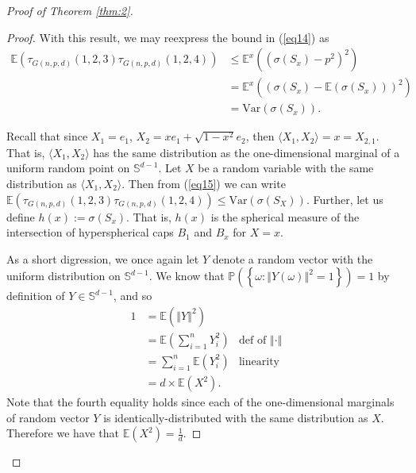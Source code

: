 \documentclass{article}
\begin{document}
\begin{proof}[Proof of Theorem \ref{thm:2}]
\begin{proof}
With this result, we may reexpress the bound in (\ref{eq14}) as
\begin{align}
    \mathbb{E}\left( \tau_{G(n,p,d)}(1,2,3)\tau_{G(n,p,d)}(1,2,4) \right) &\leq \mathbb{E}^x \left( (\sigma(S_x) - p^2)^2\right) \nonumber\\
    &=\mathbb{E}^x \left( (\sigma(S_x) - \mathbb{E}(\sigma(S_x)))^2\right) \nonumber\\
    &= \text{Var}(\sigma(S_x))\label{eq15}.
\end{align}

Recall that since $X_1 = e_1$, $X_2 = xe_1 + \sqrt{1-x^2}e_2$, then $\langle X_1, X_2 \rangle = x = X_{2,1}$. That is, $\langle X_1, X_2 \rangle$ has the same distribution as the one-dimensional marginal of a uniform random point on $\mathbb{S}^{d-1}$. Let $X$ be a random variable with the same distribution as $\langle X_1, X_2 \rangle$. Then from (\ref{eq15}) we can write $\mathbb{E}\left( \tau_{G(n,p,d)}(1,2,3)\tau_{G(n,p,d)}(1,2,4) \right) \leq \text{Var}(\sigma(S_X)).$ Further, let us define $h(x) := \sigma(S_x)$. That is, $h(x)$ is the spherical measure of the intersection of hyperspherical caps $B_1$ and $B_x$ for $X = x$.

As a short digression, we once again let  $Y$ denote a random vector with the uniform distribution on $\mathbb{S}^{d-1}$. We know that $\mathbb{P} \left( \left\{ \omega : \left \Vert Y(\omega) \right \Vert^2 = 1 \right\} \right) = 1$ by definition of $Y \in \mathbb{S}^{d-1}$, and so
\begin{align}
   1 &= \mathbb{E}\left( \left \Vert Y \right \Vert^2 \right) \nonumber\\
   &= \mathbb{E}\left(\sum_{i=1}^n Y_i^2 \right) & \text{def of $\left\Vert \cdot \right\Vert$} \nonumber\\
   &= \sum_{i=1}^n \mathbb{E}(Y_i^2) & \text{linearity} \nonumber\\
   &= d \times \mathbb{E}(X^2) \label{eq18}.
\end{align}
Note that the fourth equality holds since each of the one-dimensional marginals of random vector $Y$ is identically-distributed with the same distribution as $X$. Therefore we have that $\mathbb{E}(X^2) = \frac{1}{d}.$


\end{proof}
\end{proof}
\end{document}
